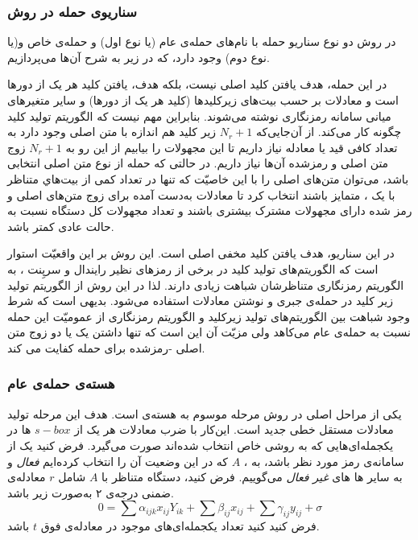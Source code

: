 \subsubsection*{سناریوی حمله در روش }
 در روش 
 دو نوع سناریو حمله با نام‌های حمله‌ی عام  (یا نوع اول) و حمله‌ی خاص و(یا نوع دوم) وجود دارد، که در زیر به شرح آن‌ها می‌پردازیم.
 \begin{definition}
 	در این حمله، هدف یافتن کلید اصلی نیست، بلکه هدف، یافتن کلید هر یک از دور‌ها  است و معادلات بر حسب بیت‌های زیرکلید‌ها (کلید هر یک از دورها)  و سایر متغیرهای میانی سامانه رمزنگاری نوشته می‌شوند. بنابراین مهم نیست که الگوریتم تولید کلید چگونه کار می‌کند.  از آن‌جایی‌که 
 	$N_{r}+1$
 	زیر کلید هم اندازه با متن اصلی وجود دارد به تعداد کافی قید یا معادله نیاز داریم تا این مجهولات را بیابیم از این رو به 
 	$N_{r}+1$
 	زوج متن اصلی و رمز‌شده‌ آن‌ها نیاز داریم. در حالتی که حمله از نوع متن اصلی انتخابی باشد، می‌توان متن‌های اصلی را با این خاصیّت که تنها در تعداد کمی از بیت‌هاي‌ متناظر با یک 
 	،
 	متمایز باشند انتخاب کرد تا معادلات به‌دست  آمده برای زوج متن‌های  اصلی و رمز شده دارای مجهولات مشترک بیشتری باشند و تعداد مجهولات کل دستگاه نسبت به حالت عادی کمتر باشد.
 \end{definition}    
 
 \begin{definition}
 	در این سناریو، هدف یافتن کلید مخفی اصلی است. این روش بر این واقعیّت استوار است که الگوریتم‌های تولید کلید در برخی از رمزهای 
 	نظیر رایندال و سرپِنت
 	، 
 	به الگوریتم رمزنگاری متناظرشان شباهت زیادی دارند. لذا در این روش از الگوریتم تولید زیر کلید در حمله‌ی جبری و نوشتن معادلات استفاده می‌شود. بدیهی است که شرط وجود شباهت بین الگوریتم‌های تولید زیر‌کلید و الگوریتم رمزنگاری از عمومیّت این حمله نسبت به حمله‌ی عام می‌کاهد ولی مزیّت آن این است که تنها داشتن یک یا دو زوج متن اصلی -رمزشده برای حمله کفایت می کند.
 \end{definition}

   \subsubsection*{هسته‌ی حمله‌ی  عام}
   یکی از مراحل اصلی در روش 
   مرحله‌ موسوم به هسته‌ی 
   است. هدف این مرحله تولید معادلات مستقل خطی جدید است. این‌کار با ضرب معادلات هر یک از 
   $s-box$
ها در یکجمله‌ای‌هایی که به روشی خاص انتخاب شده‌اند صورت می‌گیرد.
   فرض کنید 
   \textbf{}
   یک 
   از سامانه‌ی رمز
   مورد نظر باشد، به 
   ،
   $A$
   که در این وضعیت آن را انتخاب کرده‌ایم 
   \textit{فعال}
    و به سایر 
   ها 
   های 
   \textit{غیر فعال}
    می‌گوییم. فرض کنید، دستگاه متناظر با 
   $A$ 
   شامل 
   $r$
   معادله‌ی ضمنی درجه‌ی ۲  به‌صورت زیر باشد.
   \begin{equation}
   \label{sboxeq}
   0 = \sum \alpha_{ijk}x_{ij}Y_{ik} + \sum \beta_{ij}x_{ij}+ \sum \gamma_{ij}y_{ij} + \sigma
   \end{equation}
   فرض کنید کنید تعداد یکجمله‌ای‌های موجود در معادله‌ی فوق 
   $t$
   باشد.
   
